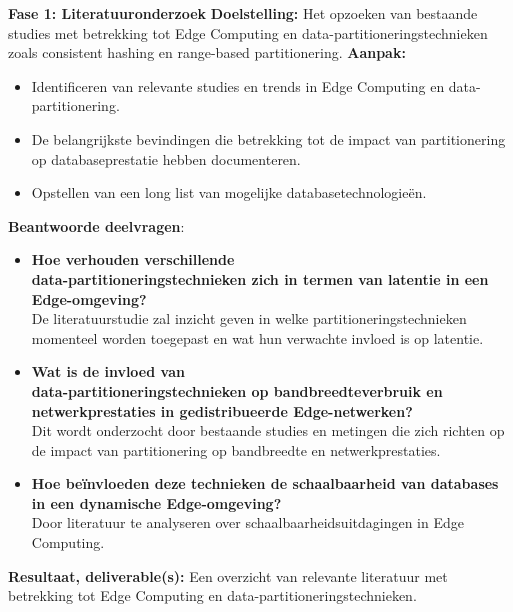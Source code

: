 \textbf{Fase 1: Literatuuronderzoek}\newline\newline
    \textbf{Doelstelling:} Het opzoeken van bestaande studies met betrekking tot Edge Computing en data-partitioneringstechnieken zoals consistent hashing en range-based partitionering.\newline\newline
    \textbf{Aanpak:}
    \begin{itemize}
      \item Identificeren van relevante studies en trends in Edge Computing en data-partitionering.
      \item De belangrijkste bevindingen die betrekking tot de impact van partitionering op databaseprestatie hebben documenteren.
      \item Opstellen van een long list van mogelijke databasetechnologieën.
    \end{itemize}
    \textbf{Beantwoorde deelvragen}:
    \begin{itemize}
    \item \textbf{Hoe verhouden verschillende \vspace{0em}\\ data-partitioneringstechnieken zich in termen van latentie in een Edge-omgeving?} \\
      De literatuurstudie zal inzicht geven in welke partitioneringstechnieken momenteel worden toegepast en wat hun verwachte invloed is op latentie.
    \item \textbf{Wat is de invloed van \vspace{0em}\\ data-partitioneringstechnieken op bandbreedteverbruik en netwerkprestaties in gedistribueerde Edge-netwerken?} \\
      Dit wordt onderzocht door bestaande studies en metingen die zich richten op de impact van partitionering op bandbreedte en netwerkprestaties.
    \item \textbf{Hoe beïnvloeden deze technieken de schaalbaarheid van databases in een dynamische Edge-omgeving?} \\
      Door literatuur te analyseren over schaalbaarheidsuitdagingen in Edge Computing.
    \end{itemize}
    \textbf{Resultaat, deliverable(s):} Een overzicht van relevante literatuur met betrekking tot Edge Computing en data-partitioneringstechnieken.\newline\newline
